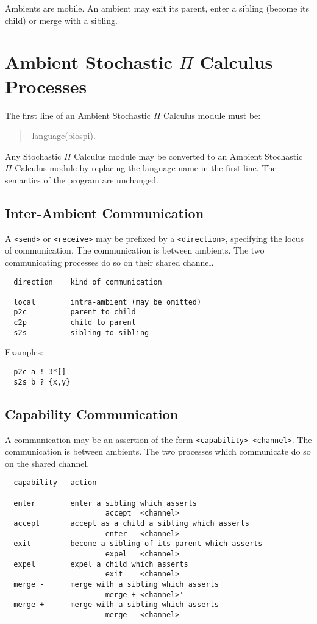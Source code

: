 Ambients are mobile. An ambient may
exit its parent, enter a sibling (become its child) or merge with a
sibling.

\section{Ambient Stochastic $\Pi$ Calculus Processes}

The first line of an Ambient Stochastic $\Pi$ Calculus module must be:

\begin{verse}
   -language(biospi).
\end{verse}

\noindent
Any Stochastic $\Pi$ Calculus module may be converted to an
Ambient Stochastic $\Pi$ Calculus module by
replacing the language name in the first line.  The semantics
of the program are unchanged.

\subsection{Inter-Ambient Communication}

A \verb+<send>+ or \verb+<receive>+ may be prefixed by a
\verb+<direction>+, specifying the locus of communication.
The communication is between ambients.  The two communicating
processes do so on their shared channel.

\begin{verbatim}
  direction    kind of communication

  local        intra-ambient (may be omitted)
  p2c          parent to child
  c2p          child to parent
  s2s          sibling to sibling
\end{verbatim}

\noindent
Examples:

\begin{verbatim}
  p2c a ! 3*[]
  s2s b ? {x,y}
\end{verbatim}

\subsection{Capability Communication}

A communication may be an assertion of the form \verb+<capability> <channel>+.
The communication is between ambients.  The two
processes which communicate do so on the shared channel.

\newpage
\begin{verbatim}
  capability   action

  enter        enter a sibling which asserts
                       accept  <channel>
  accept       accept as a child a sibling which asserts
                       enter   <channel>
  exit         become a sibling of its parent which asserts
                       expel   <channel>
  expel        expel a child which asserts
                       exit    <channel>
  merge -      merge with a sibling which asserts
                       merge + <channel>'
  merge +      merge with a sibling which asserts
                       merge - <channel>
\end{verbatim}

